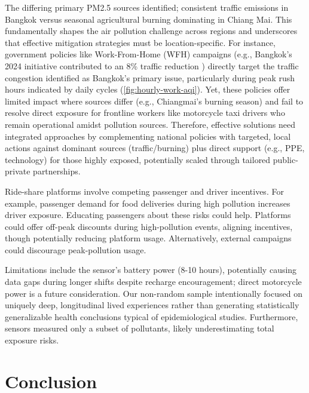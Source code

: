 \documentclass[sigconf,screen,natbib=true]{acmart}
\providecommand{\DIFadd}[1]{{\protect\color{blue}\uwave{#1}}} %
\providecommand{\DIFaddbegin}{} %
\providecommand{\DIFaddend}{} %
\begin{document}
The differing primary PM2.5 sources \DIFaddbegin \DIFadd{were }\DIFaddend identified; consistent traffic emissions in Bangkok versus seasonal agricultural burning dominating in Chiang Mai. 
This fundamentally shapes the air pollution challenge across regions and underscores that effective mitigation strategies must be location-specific. 
For instance, government policies like Work-From-Home (WFH) campaigns (e.g., Bangkok's 2024 initiative contributed to an 8\% traffic reduction  \cite{Wipatayotin_2025}) directly target the traffic congestion identified as Bangkok's primary issue, particularly during peak rush hours indicated by daily cycles (\autoref{fig:hourly-work-aqi}). 
Yet, these policies offer limited impact where sources differ (e.g., Chiangmai's burning season) and fail to resolve direct exposure for frontline workers like motorcycle taxi drivers who remain operational amidst pollution sources.
Therefore, effective solutions need integrated approaches by complementing national policies with targeted, local actions against dominant sources (traffic/burning) plus direct support (e.g., PPE, technology) for those highly exposed, potentially scaled through tailored public-private partnerships.











Ride-share platforms involve competing passenger and driver incentives.
For example, passenger demand for food deliveries during high pollution increases driver exposure.
Educating passengers about these risks could help.
Platforms could offer off-peak discounts during high-pollution events, aligning incentives, though potentially reducing platform usage.
Alternatively, external campaigns could discourage peak-pollution usage.















Limitations include the sensor's battery power (8-10 hours), potentially causing data gaps during longer shifts despite recharge encouragement; direct motorcycle power is a future consideration.
Our non-random sample intentionally focused on uniquely deep, longitudinal lived experiences rather than generating statistically generalizable health conclusions typical of epidemiological studies.
Furthermore, sensors measured only a subset of pollutants, likely underestimating total exposure risks. \section{Conclusion}
\end{document}
